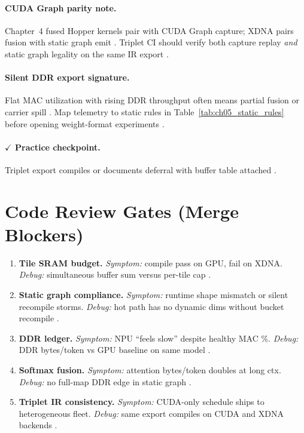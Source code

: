 \paragraph{CUDA Graph parity note.}
Chapter~4 fused Hopper kernels pair with CUDA Graph capture; XDNA pairs fusion with static graph emit \citep{nvidia2024cudagraphs,amd2024xdna,yirage2026}.
Triplet CI should verify both capture replay \emph{and} static graph legality on the same IR export \citep{chen2020compilerbasedhardw,taxbreak2026}.

\paragraph{Silent DDR export signature.}
Flat MAC utilization with rising DDR throughput often means partial fusion or carrier spill \citep{memoryfloor2026,amd2024aie,patel2025llminference}.
Map telemetry to static rules in Table~\ref{tab:ch05_static_rules} before opening weight-format experiments \citep{yirage2026,taxbreak2026}.

\paragraph{$\checkmark$ Practice checkpoint.}
Triplet export compiles or documents deferral with buffer table attached \citep{yirage2026,amd2024xdna}.

\section{Code Review Gates (Merge Blockers)}
\label{sec:ch05_review_gates}

\begin{enumerate}
\item \textbf{Tile SRAM budget.}
\emph{Symptom:} compile pass on GPU, fail on XDNA.
\emph{Debug:} simultaneous buffer sum versus per-tile cap \citep{amd2024aie,yirage2026}.

\item \textbf{Static graph compliance.}
\emph{Symptom:} runtime shape mismatch or silent recompile storms.
\emph{Debug:} hot path has no dynamic dims without bucket recompile \citep{patel2025llminference,kwon2023vllm}.

\item \textbf{DDR ledger.}
\emph{Symptom:} NPU ``feels slow'' despite healthy MAC \%.
\emph{Debug:} DDR bytes/token vs GPU baseline on same model \citep{memoryfloor2026,taxbreak2026}.

\item \textbf{Softmax fusion.}
\emph{Symptom:} attention bytes/token doubles at long ctx.
\emph{Debug:} no full-map DDR edge in static graph \citep{dao2022flashattention,dao2023flashdecoding}.

\item \textbf{Triplet IR consistency.}
\emph{Symptom:} CUDA-only schedule ships to heterogeneous fleet.
\emph{Debug:} same export compiles on CUDA and XDNA backends \citep{yirage2026,chen2020compilerbasedhardw}.
\end{enumerate}

